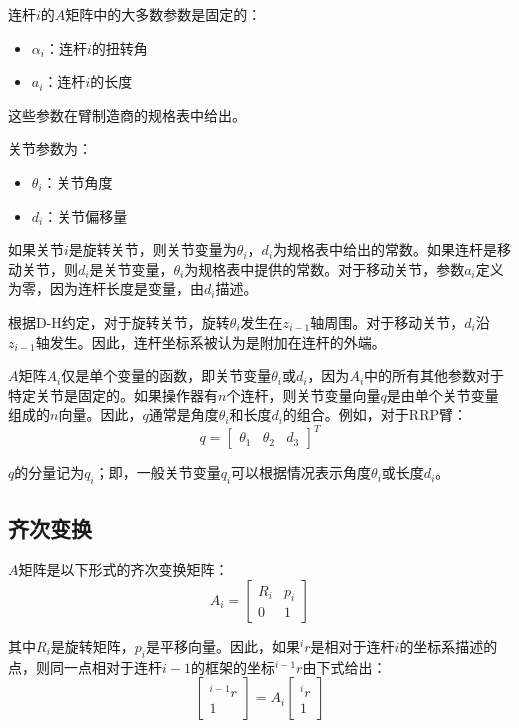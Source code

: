 \documentclass[UTF8,a4paper]{ctexart}
\begin{document}
连杆$i$的$A$矩阵中的大多数参数是固定的：
\begin{itemize}
    \item $\alpha_i$：连杆$i$的扭转角
    \item $a_i$：连杆$i$的长度
\end{itemize}
这些参数在臂制造商的规格表中给出。

关节参数为：
\begin{itemize}
    \item $\theta_i$：关节角度
    \item $d_i$：关节偏移量
\end{itemize}

如果关节$i$是旋转关节，则关节变量为$\theta_i$，$d_i$为规格表中给出的常数。如果连杆是移动关节，则$d_i$是关节变量，$\theta_i$为规格表中提供的常数。对于移动关节，参数$a_i$定义为零，因为连杆长度是变量，由$d_i$描述。

根据D-H约定，对于旋转关节，旋转$\theta_i$发生在$z_{i-1}$轴周围。对于移动关节，$d_i$沿$z_{i-1}$轴发生。因此，连杆坐标系被认为是附加在连杆的外端。

$A$矩阵$A_i$仅是单个变量的函数，即关节变量$\theta_i$或$d_i$，因为$A_i$中的所有其他参数对于特定关节是固定的。如果操作器有$n$个连杆，则关节变量向量$q$是由单个关节变量组成的$n$向量。因此，$q$通常是角度$\theta_i$和长度$d_i$的组合。例如，对于RRP臂：
\begin{equation}
q = \begin{bmatrix} \theta_1 & \theta_2 & d_3 \end{bmatrix}^T
\end{equation}

$q$的分量记为$q_i$；即，一般关节变量$q_i$可以根据情况表示角度$\theta_i$或长度$d_i$。

\subsection{齐次变换}

$A$矩阵是以下形式的齐次变换矩阵：
\begin{equation}
A_i = \begin{bmatrix} R_i & p_i \\ 0 & 1 \end{bmatrix}
\tag{A.2.2}
\end{equation}

其中$R_i$是旋转矩阵，$p_i$是平移向量。因此，如果${}^ir$是相对于连杆$i$的坐标系描述的点，则同一点相对于连杆$i-1$的框架的坐标${}^{i-1}r$由下式给出：
\begin{equation}
\begin{bmatrix} {}^{i-1}r \\ 1 \end{bmatrix} = A_i \begin{bmatrix} {}^ir \\ 1 \end{bmatrix}
\tag{A.2.3}
\end{equation}
\end{document}
